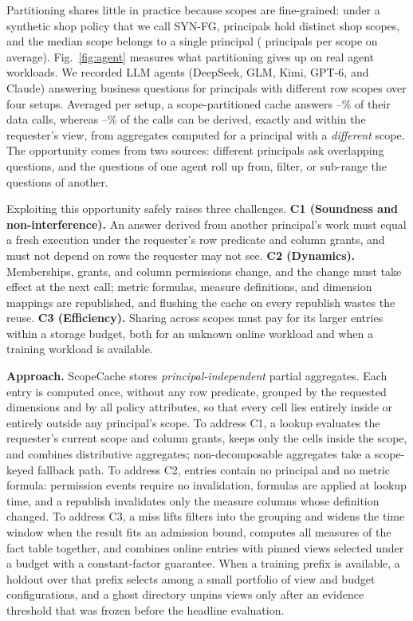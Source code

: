\documentclass[sigconf, nonacm]{acmart}
\begin{document}
Partitioning shares little in practice because scopes are fine-grained: under a synthetic shop policy that we call SYN-FG, \synfgUsers{} principals hold \synfgScopes{} distinct shop scopes, and the median scope belongs to a single principal (\synfgMean{} principals per scope on average). Fig.~\ref{fig:agent} measures what partitioning gives up on real agent workloads. We recorded \nModelsWord{} LLM agents (DeepSeek, GLM, Kimi, GPT-6, and Claude) answering business questions for principals with different row scopes over four setups. Averaged per setup, a scope-partitioned cache answers \agentPSMeanLo--\agentPSMeanHi\% of their data calls, whereas \agentXscopeMeanLo--\agentXscopeMeanHi\% of the calls can be derived, exactly and within the requester's view, from aggregates computed for a principal with a \emph{different} scope. The opportunity comes from two sources: different principals ask overlapping questions, and the questions of one agent roll up from, filter, or sub-range the questions of another.

Exploiting this opportunity safely raises three challenges.
\textbf{C1 (Soundness and non-interference).} An answer derived from another principal's work must equal a fresh execution under the requester's row predicate and column grants, and must not depend on rows the requester may not see.
\textbf{C2 (Dynamics).} Memberships, grants, and column permissions change, and the change must take effect at the next call; metric formulas, measure definitions, and dimension mappings are republished, and flushing the cache on every republish wastes the reuse.
\textbf{C3 (Efficiency).} Sharing across scopes must pay for its larger entries within a storage budget, both for an unknown online workload and when a training workload is available.

\textbf{Approach.} ScopeCache stores \emph{principal-independent} partial aggregates. Each entry is computed once, without any row predicate, grouped by the requested dimensions and by all policy attributes, so that every cell lies entirely inside or entirely outside any principal's scope. To address C1, a lookup evaluates the requester's current scope and column grants, keeps only the cells inside the scope, and combines distributive aggregates; non-decomposable aggregates take a scope-keyed fallback path. To address C2, entries contain no principal and no metric formula: permission events require no invalidation, formulas are applied at lookup time, and a republish invalidates only the measure columns whose definition changed. To address C3, a miss lifts filters into the grouping and widens the time window when the result fits an admission bound, computes all measures of the fact table together, and combines online entries with pinned views selected under a budget with a constant-factor guarantee. When a training prefix is available, a holdout over that prefix selects among a small portfolio of view and budget configurations, and a ghost directory unpins views only after an evidence threshold that was frozen before the headline evaluation.
\end{document}
